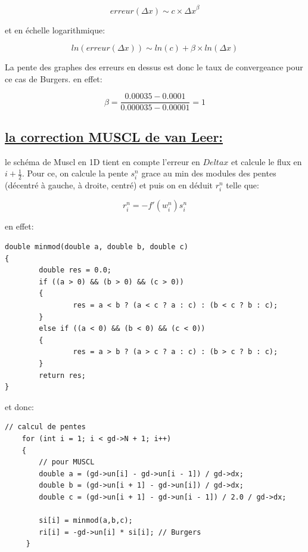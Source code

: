 $$erreur(\Delta x) \sim c \times {\Delta x}^{\beta}$$

et en \'echelle logarithmique:

$$ln(erreur({\Delta x})) \sim ln(c) + \beta \times ln({\Delta x})$$

La pente des graphes des erreurs en dessus est donc le taux de convergeance pour ce cas de Burgers. en effet:

$$ \beta = \frac{0.00035-0.0001}{0.000035-0.00001} = 1$$


\subsection[La correction MUSCL de van Leer]{\uline{la correction MUSCL de van Leer:}}

le sch\'ema de Muscl en 1D tient en compte l'erreur en $Delta x$ et calcule le flux en $i+ \frac 1 2$. Pour ce, on calcule la pente $s^n_i$ grace au min des modules des pentes (d\'ecentr\'e \`a gauche, \`a droite, centr\'e) et puis on en d\'eduit $r^n_i$ telle que:

$$r_i^n = -f'(w_i^n)s_i^n$$

en effet:

\begin{lstlisting}
double minmod(double a, double b, double c)
{
        double res = 0.0;
        if ((a > 0) && (b > 0) && (c > 0))
        {
                res = a < b ? (a < c ? a : c) : (b < c ? b : c);
        }
        else if ((a < 0) && (b < 0) && (c < 0))
        {
                res = a > b ? (a > c ? a : c) : (b > c ? b : c);
        }
        return res;
}
\end{lstlisting}

et donc:

\begin{lstlisting}
// calcul de pentes
    for (int i = 1; i < gd->N + 1; i++)
    {
        // pour MUSCL
        double a = (gd->un[i] - gd->un[i - 1]) / gd->dx;
        double b = (gd->un[i + 1] - gd->un[i]) / gd->dx;
        double c = (gd->un[i + 1] - gd->un[i - 1]) / 2.0 / gd->dx;

        si[i] = minmod(a,b,c);
        ri[i] = -gd->un[i] * si[i]; // Burgers
     }
\end{lstlisting}        








































